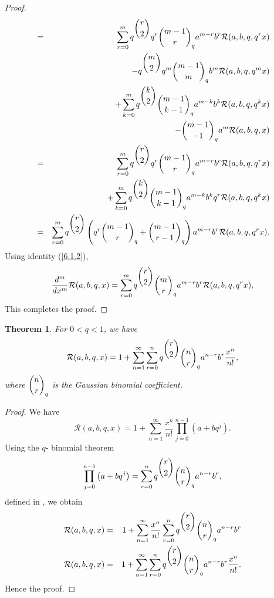\documentclass[12pt]{article}
\newtheorem{The}{Theorem}[section]
\numberwithin{equation}{section}
\begin{document}
\begin{proof}
\begin{eqnarray*}
&=& \sum_{r=0}^{m} q^{\dbinom{r}{2}} q^r \dbinom{m-1}{r}_q  a^{m-r} b^r  \mathcal{R}(a,b,q,q^rx)\nonumber\\
&& - q^{\dbinom{m}{2}} q^m  \dbinom{m-1}{m}_q b^m  \mathcal{R}(a,b,q,q^m x) \\
&& + \sum_{k=0}^{m} q^{\dbinom{k}{2}} \dbinom{m-1}{k-1}_q a^{m-k} b^k \mathcal{R}(a,b,q,q^kx) \nonumber\\
&& -  \dbinom{m-1}{-1}_q a^m  \mathcal{R}(a,b,q, x) \\
&=& \sum_{r=0}^{m} q^{\dbinom{r}{2}} q^r \dbinom{m-1}{r}_q  a^{m-r} b^r  \mathcal{R}(a,b,q,q^rx)\\
&& + \sum_{k=0}^{m} q^{\dbinom{k}{2}} \dbinom{m-1}{k-1}_q a^{m-k} b^k q^r \mathcal{R}(a,b,q,q^kx) \\
&=& \sum_{r=0}^{m} q^{\dbinom{r}{2}} \left(q^r \dbinom{m-1}{r}_q + \dbinom{m-1}{r-1}_q \right) a^{m-r} b^r  \mathcal{R}(a,b,q,q^rx).
\end{eqnarray*}
Using identity (\ref{6.1.2}),
\begin{equation}
 \frac{d^m}{dx^m}\mathcal{R}(a,b,q,x)= \sum_{r=0}^m q^{\dbinom{r}{2}} \dbinom{m}{r}_q a^{m-r} b^r \mathcal{R}(a,b,q,q^rx),
\end{equation}
This completes the proof.
\end{proof}

\begin{The}
For $0<q<1$, we have 
\begin{equation}
 \mathcal{R}(a, b, q, x) =  1 + \sum_{n=1}^\infty \sum_{r=0}^n q^{\dbinom{r}{2}}\dbinom{n}{r}_q a^{n-r}b^r \frac{x^n}{n!},
\end{equation}
where $\dbinom{n}{r}_q$ is the Gaussian binomial coefficient.
\end{The}
\begin{proof}
We have 
\begin{equation}
\mathcal{R}(a, b, q, x) =  1 + \sum_{n=1}^\infty \frac{x^n}{n!}\prod_{j=0}^{n-1}\left(a+bq^j\right).
\end{equation}
Using the $q$- binomial theorem 
\begin{equation}
\prod_{j=0}^{n-1}\left(a+bq^j\right) = \sum_{r=0}^n q^{\dbinom{r}{2}}\dbinom{n}{r}_q a^{n-r}b^r,\label{6.5.5} 
\end{equation}
defined in \cite{Richard}, we obtain
\begin{eqnarray}
\mathcal{R}(a, b, q, x) &=&  1 + \sum_{n=1}^\infty \frac{x^n}{n!}\sum_{r=0}^n q^{\dbinom{r}{2}}\dbinom{n}{r}_q a^{n-r}b^r\nonumber\\
\mathcal{R}(a, b, q, x) &=&   1 + \sum_{n=1}^\infty \sum_{r=0}^n q^{\dbinom{r}{2}}\dbinom{n}{r}_q a^{n-r}b^r \frac{x^n}{n!}.
\end{eqnarray}
Hence the proof.
\end{proof}
\end{document}
